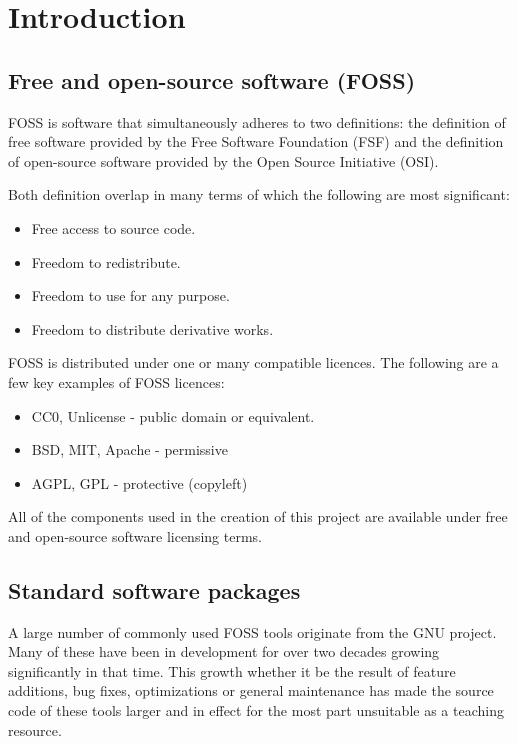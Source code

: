 \section{Introduction}\label{Introduction}

\subsection{Free and open-source software (FOSS)}

FOSS is software that simultaneously adheres to two definitions: the definition of free software provided by the Free Software Foundation (FSF) and the definition of open-source software provided by the Open Source Initiative (OSI).

Both definition overlap in many terms of which the following are most significant:

\begin{itemize}
    \item Free access to source code.
    \item Freedom to redistribute.
    \item Freedom to use for any purpose.
    \item Freedom to distribute derivative works.
\end{itemize}

FOSS is distributed under one or many compatible licences. The following are a few key examples of FOSS licences:

\begin{itemize}
    \item CC0, Unlicense - public domain or equivalent.
    \item BSD, MIT, Apache - permissive
    \item AGPL, GPL - protective (copyleft)
\end{itemize}

All of the components used in the creation of this project are available under free and open-source software licensing terms.

\subsection{Standard software packages}

A large number of commonly used FOSS tools originate from the GNU project. Many of these have been in development for over two decades growing significantly in that time. This growth whether it be the result of feature additions, bug fixes, optimizations or general maintenance has made the source code of these tools larger and in effect for the most part unsuitable as a teaching resource.

